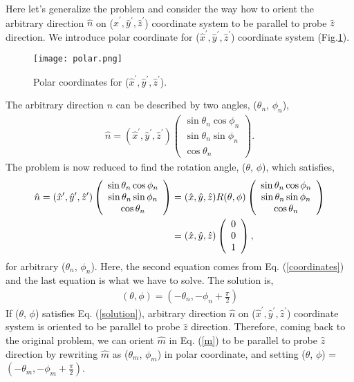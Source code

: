 \documentclass[a4,10.5pt]{report}
\begin{document}
Here let's generalize the problem and consider the way how to orient the arbitrary direction $\hat{n}$ on ($\hat{x}^\prime, \hat{y}^\prime, \hat{z}^\prime$) coordinate system
to be parallel to probe $\hat{z}$ direction.
We introduce polar coordinate for ($\hat{x}^\prime, \hat{y}^\prime, \hat{z}^\prime$) coordinate system (Fig.\ref{polar}).
\begin{figure}
  \centering
  \texttt{[image: polar.png]}
  \caption{Polar coordinates for ($\hat{x}^\prime, \hat{y}^\prime, \hat{z}^\prime$).}
  \label{polar}
\end{figure}
The arbitrary direction $\hat{n}$ can be described by two angles, ($\theta_n$, $\phi_n$),
\begin{align}
\hat{n} = 
(\hat{x}^\prime, \hat{y}^\prime, \hat{z}^\prime)
\left(
\begin{array}{c}
\sin\theta_n\cos\phi_n \\
\sin\theta_n\sin\phi_n \\
\cos\theta_n
\end{array}
\right).
\end{align}
The problem is now reduced to find the rotation angle, ($\theta$, $\phi$), which satisfies,
\begin{align}
\hat{n} = 
(\hat{x}^\prime, \hat{y}^\prime, \hat{z}^\prime)  
\left(
\begin{array}{c}
\sin\theta_n\cos\phi_n \\
\sin\theta_n\sin\phi_n \\
\cos\theta_n
\end{array}
\right)
&= (\hat{x}, \hat{y}, \hat{z}) R(\theta, \phi)
\left(
\begin{array}{c}
\sin\theta_n\cos\phi_n \\
\sin\theta_n\sin\phi_n \\
\cos\theta_n
\end{array}
\right) \notag\\
&= (\hat{x}, \hat{y}, \hat{z})
\left(
\begin{array}{c}
0 \\
0 \\
1
\end{array}
\right),
\end{align}
for arbitrary ($\theta_n$, $\phi_n$).
Here, the second equation comes from Eq. (\ref{coordinates}) and the last equation is what we have to solve.
The solution is, 
\begin{align}
\label{solution}
(\theta, \phi) = \left(-\theta_n, -\phi_n + \frac{\pi}{2}\right)
\end{align}
If ($\theta$, $\phi$) satisfies Eq. (\ref{solution}), arbitrary direction $\hat{n}$ on ($\hat{x}^\prime, \hat{y}^\prime, \hat{z}^\prime$) coordinate system
is oriented to be parallel to probe $\hat{z}$ direction.
Therefore, coming back to the original problem, we can orient $\hat{m}$ in Eq. (\ref{m}) to be parallel to probe $\hat{z}$ direction
by rewriting $\hat{m}$ as ($\theta_m$, $\phi_m$) in polar coordinate, and setting ($\theta$, $\phi$) = $\left(-\theta_m, -\phi_m+\frac{\pi}{2}\right)$.
\end{document}
